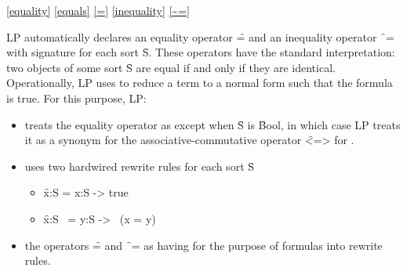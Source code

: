 \ref{equality}
\ref{equals}
\ref{=}
\ref{inequality}
\ref{~=}

LP automatically declares an equality operator \f{=} and an inequality operator
\f{~=} with signature  for each sort \f{S}.  These operators 
have the standard interpretation: two objects of some sort \f{S} are equal if
and only if they are identical.
\p
Operationally, LP uses 
to reduce a term  to a normal form  such that the formula 
 is true.  For this purpose, LP:
\begin{itemize}
\item
treats the equality operator as  except
when \f{S} is \f{Bool}, in which case LP treats it as a synonym for the
associative-commutative operator \f{<=>} for 
. 
\item
uses two hardwired rewrite rules for each sort \f{S}
\begin{itemize}
\item \f{x:S = x:S -> true}
\item \f{x:S ~= y:S -> ~(x = y)}
\end{itemize}
\item
{} the operators \f{=} and \f{~=} as
having  for the purpose of
 formulas into rewrite rules.
\end{itemize}

